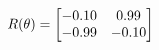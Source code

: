 \documentclass[preview]{standalone}
\begin{document}
\begin{align*}
\special{dvisvgm:raw <g id='unique000'>}R(\theta) = \begin{bmatrix}-0.10 & 0.99\\-0.99 & -0.10\end{bmatrix}\special{dvisvgm:raw </g>}
\end{align*}
\end{document}
